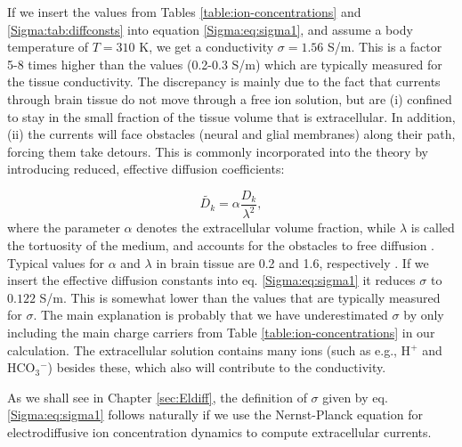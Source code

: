 If we insert the values from Tables \ref{table:ion-concentrations} and \ref{Sigma:tab:diffconsts} into equation \ref{Sigma:eq:sigma1}, and assume a body temperature of $T = 310$ K, we get a conductivity $\sigma = 1.56$ S/m. This is a factor 5-8 times higher than the values (0.2-0.3 S/m) which are typically measured for the tissue conductivity. The discrepancy is mainly due to the fact that currents through brain tissue do not move through a free ion solution, but are (i) confined to stay in the small fraction of the tissue volume that is extracellular. In addition, (ii) the currents will face obstacles (neural and glial membranes) along their path, forcing them take detours. This is commonly incorporated into the theory by introducing reduced, effective diffusion coefficients: 

\begin{equation}
\tilde{D_k} = \alpha \frac{D_k}{\lambda^2}, 
\label{Sigma:eq:diffconst}
\end{equation}
where the parameter $\alpha$ denotes the extracellular volume fraction, while $\lambda$ is called the tortuosity of the medium, and accounts for the obstacles to free diffusion \citep{Nicholson1998}. Typical values for $\alpha$ and $\lambda$ in brain tissue are 0.2 and 1.6, respectively \citep{Nicholson1981, Nicholson1998}. If we insert the effective diffusion constants into eq. \ref{Sigma:eq:sigma1} it reduces $\sigma$ to $0.122$ S/m. This is somewhat lower than the values that are typically measured for $\sigma$. The main explanation is probably that we have underestimated $\sigma$ by only including the main charge carriers from Table \ref{table:ion-concentrations} in our calculation. The extracellular solution contains many ions (such as e.g., H$^+$ and HCO$_3$$^-$) besides these, which also will contribute to the conductivity. 


As we shall see in Chapter \ref{sec:Eldiff}, the definition of $\sigma$ given by eq. \ref{Sigma:eq:sigma1} follows naturally if we use the Nernst-Planck equation for electrodiffusive ion concentration dynamics to compute extracellular currents. 

